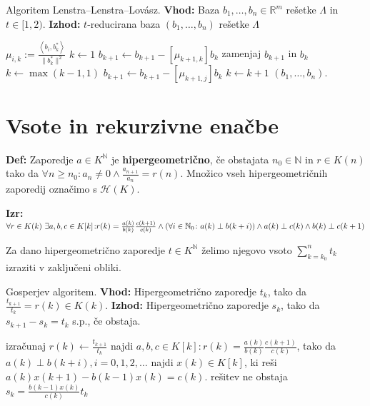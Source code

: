 \documentclass[a4paper,oneside,10pt]{article}
\theoremstyle{definition}
\newcommand{\R}{\ensuremath{\mathbb{R}}}
\newcommand{\N}{\ensuremath{\mathbb{N}}}
\let\oldtextbf\textbf
\renewcommand{\textbf}[1]{\oldtextbf{\boldmath #1}}
\begin{document}
\begin{algorithm}[!ht]
\caption{Algoritem Lenstra–Lenstra–Lovász. \newline
\textbf{Vhod:} Baza $b_1, \ldots,b_n \in \R^m$ rešetke $\Lambda$ in $t \in [1, 2)$. \newline
\textbf{Izhod:} $t$-reducirana baza $(b_1, \ldots, b_n)$ rešetke $\Lambda$}
\label{alg:lll}
\begin{algorithmic}[1]
    \State $\mu_{i,k} := \frac{\left<b_i, b_k^*\right>}{\|b_k^*\|^2}$
    \State $k \gets 1$
        \State $b_{k+1} \gets b_{k+1} - [\mu_{k+1, k}]b_k$
            \State zamenjaj $b_{k+1}$ in $b_k$
            \State $k \gets \max(k-1, 1)$
        \Else {}
            \State $b_{k+1} \gets b_{k+1} - [\mu_{k+1, j}]b_k$
            \State $k \gets k+1$
        \EndFor \EndIf
    \EndWhile
    \State \Return $(b_1, \ldots, b_n)$.
\EndProcedure
\end{algorithmic}
\end{algorithm}

\section*{Vsote in rekurzivne enačbe}

\textbf{Def:} Zaporedje $a \in K^\N$ je \textbf{hipergeometrično}, če obstajata $n_0 \in \N$ in $r \in K(n)$ tako da $\forall n \geq n_0 \colon a_n \neq 0 \land \frac{a_{n+1}}{a_n} = r(n)$. Množico vseh hipergeometričnih zaporedij označimo s $\mathcal{H}(K)$.

\textbf{Izr:} $\forall r \in K(k)\ \exists a, b, c \in K[k] \colon \\
r(k) = \frac{a(k)}{b(k)}\frac{c(k+1)}{c(k)} \land
\left(\forall i \in \N_0 \colon a(k) \perp b(k+i)\right) \land
a(k) \perp c(k) \land b(k) \perp c(k+1)$

Za dano hipergeometrično zaporedje $t \in K^\N $ želimo njegovo vsoto $\sum_{k=k_0}^{n} t_k$ izraziti v zaključeni obliki.

\begin{algorithm}[!ht]
\caption{Gosperjev algoritem. \newline
\textbf{Vhod:} Hipergeometrično zaporedje $t_k$, tako da $\frac{t_{k+1}}{t_k} = r(k) \in K(k)$. \newline
\textbf{Izhod:} Hipergeometrično zaporedje $s_k$, tako da $s_{k+1} - s_k = t_k$ s.p., če obstaja.}
\label{alg:gosper}
\begin{algorithmic}[1]
    \State izračunaj $r(k) \gets \frac{t_{k+1}}{t_k}$
    \State najdi $a, b, c \in K[k] \colon r(k) = \frac{a(k)}{b(k)}\frac{c(k+1)}{c(k)}$, tako da $a(k) \perp b(k+i), i = 0, 1, 2, \ldots$
    \State najdi $x(k) \in K[k]$, ki reši $a(k) x(k+1) - b(k-1)x(k) = c(k)$.
        \State \Return rešitev ne obstaja
    \Else
        \State \Return $s_k = \frac{b(k-1)x(k)}{c(k)} t_k$
    \EndIf
\EndProcedure
\end{algorithmic}
\end{algorithm}
\end{document}
